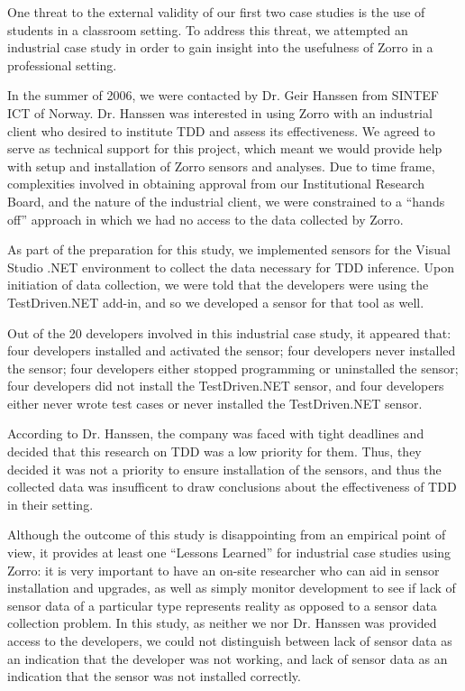 \documentclass[smallextended]{svjour3}     %
\begin{document}
One threat to the  external validity of our first two case studies is the use of students in a classroom setting.  To address this threat, we attempted an industrial case study in order to gain insight into the usefulness of Zorro in a professional setting.

In the summer of 2006, we were contacted by Dr. Geir Hanssen from SINTEF ICT of Norway.  Dr. Hanssen was interested in using Zorro with an industrial client who desired to institute TDD and assess its effectiveness.  We agreed to serve as technical support for this project, which meant we would provide help with setup and installation of Zorro sensors and analyses.  Due to time frame, complexities involved in obtaining approval from our Institutional Research Board,  and the nature of the industrial client, we were constrained to a ``hands off'' approach in which we had no access to the data collected by Zorro.

As part of the preparation for this study, we implemented sensors for the
Visual Studio .NET environment to collect the data necessary for TDD
inference.  Upon initiation of data collection, we were told that the
developers were using the TestDriven.NET add-in, and so we developed a
sensor for that tool as well.

Out of the 20 developers involved in this industrial case study, it appeared that: four developers installed and activated the sensor; four developers never installed the sensor; four developers either stopped programming or uninstalled the sensor; four developers did not install the TestDriven.NET sensor, and four developers either never wrote test cases or never installed the TestDriven.NET sensor.

According to Dr. Hanssen, the company was faced with tight deadlines and
decided that this research on TDD was a low priority for them.  Thus, they
decided it was not a priority to ensure installation of the sensors, and
thus the collected data was insufficent to draw conclusions about the effectiveness
of TDD in their setting.

Although the outcome of this study is disappointing from an empirical point of view, it provides at least one ``Lessons Learned'' for industrial case studies using Zorro: it is very important to have an on-site researcher who can aid in sensor installation and upgrades, as well as simply monitor development to see if lack of sensor data of a particular type represents reality as opposed to a sensor data collection problem.  In this study, as neither we nor Dr. Hanssen was provided access to the developers, we could not distinguish between lack of sensor data as an indication that the developer was not working, and lack of sensor data as an indication that the sensor was not installed correctly.
\end{document}

